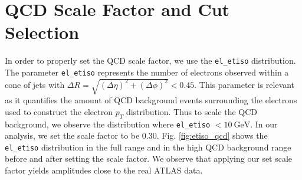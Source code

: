 \documentclass[a4paper]{report}
\numberwithin{equation}{section}
\begin{document}
\section{QCD Scale Factor and Cut Selection}   \label{sec:qcdscale_cuts}

In order to properly set the QCD scale factor, we use the \texttt{el\_etiso} distribution. The parameter \texttt{el\_etiso} 
represents the number of electrons observed within a cone of jets with $\Delta R = \sqrt{(\Delta \eta)^2 + (\Delta\phi)^2} < 0.45$. 
This parameter is relevant as it quantifies the amount of QCD background events surrounding the electrons used to construct the 
electron $p_T$ distribution. Thus to scale the QCD background, we observe the distribution where \texttt{el\_etiso} $< \SI{10}{\giga\electronvolt}$.
In our analysis, we set the scale factor to be 0.30. Fig. \ref{fig:etiso_qcd} shows the \texttt{el\_etiso} distribution in the full range 
and in the high QCD background range before and after setting the scale factor. We observe that applying our set scale factor 
yields amplitudes close to the real ATLAS data. \par 
\end{document}
